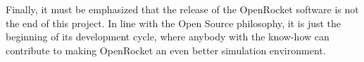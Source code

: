 Finally, it must be emphasized that the release of the OpenRocket
software is not the end of this project.  In line with the Open Source
philosophy, it is just the beginning of its development cycle,
where anybody with the know-how can contribute to making OpenRocket an
even better simulation environment.



